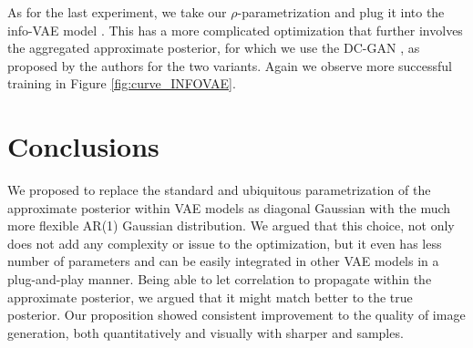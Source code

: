 \documentclass{article}
\begin{document}
%
%

As for the last experiment, we take our $\rho$-parametrization and plug it into the info-VAE model \cite{InfoVAE}. This has a more complicated optimization that further involves the aggregated approximate posterior, for which we use the DC-GAN \cite{radford2015unsupervised}, as proposed by the authors for the two variants. Again we observe more successful training in Figure \ref{fig:curve_INFOVAE}.


\section{Conclusions} \label{sec:conclusions}
We proposed to replace the standard and ubiquitous parametrization of the approximate posterior within VAE models as diagonal Gaussian with the  much more flexible AR(1) Gaussian distribution. We argued that this choice, not only does not add any complexity or issue to the optimization, but it even has less number of parameters and can be easily integrated in other VAE models in a plug-and-play manner. Being able to let correlation to propagate within the approximate posterior, we argued that it might match better to the true posterior. Our proposition showed consistent improvement to the quality of image generation, both quantitatively and visually with sharper and samples. 
\FloatBarrier




\end{document}
